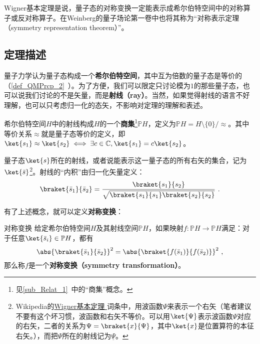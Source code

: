 





Wigner基本定理是说，量子态的对称变换一定能表示成希尔伯特空间中的对称算子或反对称算子。在Weinberg的量子场论第一卷\cite{WeinbergQFT1}中也将其称为“对称表示定理（symmetry representation theorem）”。

\subsection{定理描述}

量子力学认为量子态构成一个\textbf{希尔伯特空间}，其中互为倍数的量子态是等价的（\autoref{def_QMPrcp_2}~）。为了方便，我们可以限定只讨论模为$1$的那些量子态，也可以说我们讨论的不是矢量，而是\textbf{射线（ray）}。当然，如果觉得射线的语言不好理解，也可以只考虑归一化的态矢，不影响对定理的理解和表述。

希尔伯特空间$H$中的射线构成$H$的一个\textbf{商集}\footnote{见\autoref{sub_Relat_1}~中的“商集”概念。}$\mathbb{P}H$，定义为${\displaystyle \mathbb {P} H=H\setminus \{0\}/{\approx }}$。其中等价关系$\approx$就是量子态等价的定义，即$\ket{s_1}\approx\ket{s_2}\iff \exists c\in\mathbb{C}, \ket{s_1}=c\ket{s_2}$。

量子态$\ket{s}$所在的射线，或者说能表示这一量子态的所有右矢的集合，记为$\ket{\bar{s}}$\footnote{Wikipedia的\href{https://en.wikipedia.org/wiki/Wigner_theorem}{Wigner基本定理
}词条中，用波函数$\Psi$来表示一个右矢（笔者建议不要有这个坏习惯，波函数和右矢不等价。可以用$\ket{\Psi}$表示波函数$\Psi$对应的右矢，二者的关系为$\Psi=\braket{x}{\Psi}$，其中$\ket{x}$是位置算符的本征右矢。），而把$\Psi$所在的射线记为$\underline{\Psi}$。}。射线的“内积”由归一化矢量定义：
\begin{equation}
\braket{\bar{s}_1}{\bar{s}_2} = \frac{\braket{s_1}{s_2}}{\sqrt{\braket{s_1}{s_1}\braket{s_2}{s_2}}}~.
\end{equation}

有了上述概念，就可以定义\textbf{对称变换}：

\begin{definition}{对称变换}\label{def_WigThe_1}
给定希尔伯特空间$H$及其射线空间$\mathbb{P}H$，如果映射$f:\mathbb{P}H\to\mathbb{P}H$满足：对于任意$\ket{\bar{s}_i}\in\mathbb{P}H$，都有
\begin{equation}\label{eq_WigThe_1}
\abs{\braket{\bar{s}_1}{\bar{s}_2}}^2 = \abs{\braket{f(\bar{s}_1)}{f(\bar{s}_2)}}^2~,
\end{equation}
那么称$f$是一个\textbf{对称变换（symmetry transformation）}。
\end{definition}

